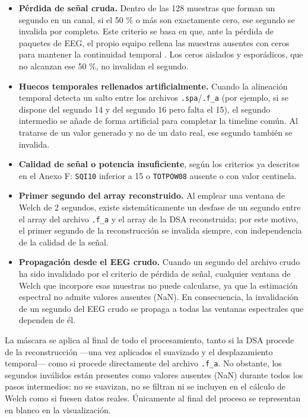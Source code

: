 \documentclass[
  spanish,
  a4paper,
  12pt,
  twoside]{memoir}
\providecommand{\tightlist}{%
  \setlength{\itemsep}{0pt}\setlength{\parskip}{0pt}}
\begin{document}
\begin{itemize}
\tightlist
\item
  \textbf{Pérdida de señal cruda.} Dentro de las 128 muestras que forman
  un segundo en un canal, si el 50 \% o más son exactamente cero, ese
  segundo se invalida por completo. Este criterio se basa en que, ante
  la pérdida de paquetes de EEG, el propio equipo rellena las muestras
  ausentes con ceros para mantener la continuidad temporal
  \citep{CovidienSerial2010}. Los ceros aislados y esporádicos, que no
  alcanzan ese 50 \%, no invalidan el segundo.
\item
  \textbf{Huecos temporales rellenados artificialmente.} Cuando la
  alineación temporal detecta un salto entre los archivos
  \texttt{.spa}/\texttt{.f\_a} (por ejemplo, si se dispone del segundo
  14 y del segundo 16 pero falta el 15), el segundo intermedio se añade
  de forma artificial para completar la timeline común. Al tratarse de
  un valor generado y no de un dato real, ese segundo también se
  invalida.
\item
  \textbf{Calidad de señal o potencia insuficiente}, según los criterios
  ya descritos en el Anexo F: \texttt{SQI10} inferior a 15 o
  \texttt{TOTPOW08} ausente o con valor centinela.
\item
  \textbf{Primer segundo del array reconstruido.} Al emplear una ventana
  de Welch de 2 segundos, existe sistemáticamente un desfase de un
  segundo entre el array del archivo \texttt{.f\_a} y el array de la DSA
  reconstruida; por este motivo, el primer segundo de la reconstrucción
  se invalida siempre, con independencia de la calidad de la señal.
\item
  \textbf{Propagación desde el EEG crudo.} Cuando un segundo del archivo
  crudo ha sido invalidado por el criterio de pérdida de señal,
  cualquier ventana de Welch que incorpore esas muestras no puede
  calcularse, ya que la estimación espectral no admite valores ausentes
  (NaN). En consecuencia, la invalidación de un segundo del EEG crudo se
  propaga a todas las ventanas espectrales que dependen de él.
\end{itemize}

La máscara se aplica al final de todo el procesamiento, tanto si la DSA
procede de la reconstrucción ---una vez aplicados el suavizado y el
desplazamiento temporal--- como si procede directamente del archivo
\texttt{.f\_a}. No obstante, los segundos inválidos están presentes como
valores ausentes (NaN) durante todos los pasos intermedios: no se
suavizan, no se filtran ni se incluyen en el cálculo de Welch como si
fuesen datos reales. Únicamente al final del proceso se representan en
blanco en la visualización.
\end{document}

